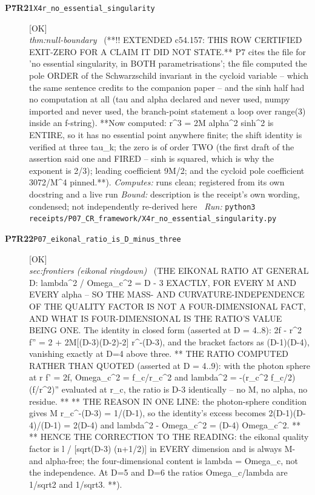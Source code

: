 \begin{description}
\item[\textbf{P7R21}\quad\texttt{X4r\_no\_essential\_singularity}]\hfill\textsf{[OK]}\\
\textit{thm:null-boundary} \ (**!! EXTENDED c54.157: THIS ROW CERTIFIED EXIT-ZERO FOR A CLAIM IT DID NOT STATE.** P7 cites the file for 'no essential singularity, in BOTH parametrisations'; the file computed the pole ORDER of the Schwarzschild invariant in the cycloid variable -- which the same sentence credits to the companion paper -- and the sinh half had no computation at all (tau and alpha declared and never used, numpy imported and never used, the branch-point statement a loop over range(3) inside an f-string). **Now computed: r\textasciicircum{}3 = 2M alpha\textasciicircum{}2 sinh\textasciicircum{}2 is ENTIRE, so it has no essential point anywhere finite; the shift identity is verified at three tau\_k; the zero is of order TWO (the first draft of the assertion said one and FIRED -- sinh is squared, which is why the exponent is 2/3); leading coefficient 9M/2; and the cycloid pole coefficient 3072/M\textasciicircum{}4 pinned.**). 
\emph{Computes:} runs clean; registered from its own docstring and a live run
 \emph{Bound:} description is the receipt's own wording, condensed; not independently re-derived here
\ \emph{Run:} \texttt{python3 receipts/P07\_CR\_framework/X4r\_no\_essential\_singularity.py}
\item[\textbf{P7R22}\quad\texttt{P07\_eikonal\_ratio\_is\_D\_minus\_three}]\hfill\textsf{[OK]}\\
\textit{sec:frontiers (eikonal ringdown)} \ (THE EIKONAL RATIO AT GENERAL D: lambda\textasciicircum{}2 / Omega\_c\textasciicircum{}2 = D - 3 EXACTLY, FOR EVERY M AND EVERY alpha -- SO THE MASS- AND CURVATURE-INDEPENDENCE OF THE QUALITY FACTOR IS NOT A FOUR-DIMENSIONAL FACT, AND WHAT IS FOUR-DIMENSIONAL IS THE RATIO'S VALUE BEING ONE. The identity in closed form (asserted at D = 4..8): 2f - r\textasciicircum{}2 f'' = 2 + 2M[(D-3)(D-2)-2] r\textasciicircum{}-(D-3), and the bracket factors as (D-1)(D-4), vanishing exactly at D=4 above three. ** THE RATIO COMPUTED RATHER THAN QUOTED (asserted at D = 4..9): with the photon sphere at r f' = 2f, Omega\_c\textasciicircum{}2 = f\_c/r\_c\textasciicircum{}2 and lambda\textasciicircum{}2 = -(r\_c\textasciicircum{}2 f\_c/2)(f/r\textasciicircum{}2)'' evaluated at r\_c, the ratio is D-3 identically -- no M, no alpha, no residue. ** ** THE REASON IN ONE LINE: the photon-sphere condition gives M r\_c\textasciicircum{}-(D-3) = 1/(D-1), so the identity's excess becomes 2(D-1)(D-4)/(D-1) = 2(D-4) and lambda\textasciicircum{}2 - Omega\_c\textasciicircum{}2 = (D-4) Omega\_c\textasciicircum{}2. ** ** HENCE THE CORRECTION TO THE READING: the eikonal quality factor is l / [sqrt(D-3) (n+1/2)] in EVERY dimension and is always M- and alpha-free; the four-dimensional content is lambda = Omega\_c, not the independence. At D=5 and D=6 the ratios Omega\_c/lambda are 1/sqrt2 and 1/sqrt3. **). 

\end{description}
